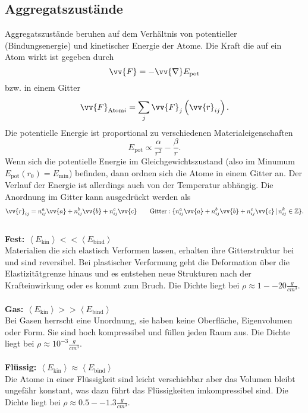 \documentclass[a4paper,12pt]{article}
\begin{document}
\subsection{Aggregatszustände}
Aggregatszustände beruhen auf dem Verhältnis von potentieller (Bindungsenergie) und kinetischer Energie der Atome. Die Kraft die auf ein Atom wirkt ist gegeben durch 
\[ 
        \vv{F}=-\vv{\nabla}E_{\text{pot}}
\] 
bzw. in einem Gitter
\[ 
        \vv{F}_{\text{Atom}i}=\sum_{j}^{}\vv{F}_j\left(\vv{r}_{ij}\right)
.\] 
Die potentielle Energie ist proportional zu verschiedenen Materialeigenschaften
\[ 
        E_{\text{pot}}\propto \dfrac{\alpha }{r^2}-\dfrac{\beta }{r}
.\] 
Wenn sich die potentielle Energie im Gleichgewichtszustand (also im Minumum $E_{\text{pot}}\left(r_0\right)=E_{\text{min}}$) befinden, dann ordnen sich die Atome in einem Gitter an. Der Verlauf der Energie ist allerdings auch von der Temperatur abhängig. Die Anordnung im Gitter kann ausgedrückt werden als
\[ 
        \vv{r}_{ij}=n _{ij}^a\vv{a}+n _{ij}^b\vv{b}+n _{ij}^c\vv{c}\qquad \text{Gitter}:\{n _{ij}^a\vv{a}+n _{ij}^b\vv{b}+n _{ij}^c\vv{c}\,|\, n _{ij}^k \in \mathbb{Z}\}
.\] 
\hfill\\\textbf{Fest: $\left\langle E_{\text{kin}}\right\rangle <<\left\langle E_{\text{bind}}\right\rangle $}\\ 
Materialien die sich elastisch Verformen lassen, erhalten ihre Gitterstruktur bei und sind reversibel. Bei plastischer Verformung geht die Deformation über die Elastizitätgrenze hinaus und es entstehen neue Strukturen nach der Krafteinwirkung oder es kommt zum Bruch. Die Dichte liegt bei $\rho \approx 1--20\tfrac{g}{cm^3}$. 
\\\hfill\\\textbf{Gas: $\left\langle E_{\text{kin}}\right\rangle >>\left\langle E_{\text{bind}}\right\rangle $}\\ 
Bei Gasen herrscht eine Unordnung, sie haben keine Oberfläche, Eigenvolumen oder Form. Sie sind hoch kompressibel und füllen jeden Raum aus. Die Dichte liegt bei $\rho \approx 10^{-3}\tfrac{g}{cm^3}$.
\\\hfill\\\textbf{Flüssig: $\left\langle E_{\text{kin}}\right\rangle \approx \left\langle E_{\text{bind}}\right\rangle $}\\ 
Die Atome in einer Flüssigkeit sind leicht verschiebbar aber das Volumen bleibt ungefähr konstant, was dazu führt das Flüssigkeiten imkompressibel sind. Die Dichte liegt bei $\rho \approx 0.5--1.3 \tfrac{g}{cm^3}$.
\end{document}
